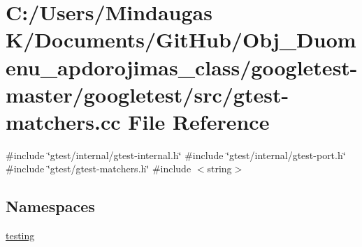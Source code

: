 \hypertarget{googletest-master_2googletest_2src_2gtest-matchers_8cc}{}\section{C\+:/\+Users/\+Mindaugas K/\+Documents/\+Git\+Hub/\+Obj\+\_\+\+Duomenu\+\_\+apdorojimas\+\_\+class/googletest-\/master/googletest/src/gtest-\/matchers.cc File Reference}
\label{googletest-master_2googletest_2src_2gtest-matchers_8cc}
{\ttfamily \#include \char`\"{}gtest/internal/gtest-\/internal.\+h\char`\"{}}\newline
{\ttfamily \#include \char`\"{}gtest/internal/gtest-\/port.\+h\char`\"{}}\newline
{\ttfamily \#include \char`\"{}gtest/gtest-\/matchers.\+h\char`\"{}}\newline
{\ttfamily \#include $<$string$>$}\newline
\subsection*{Namespaces}
\begin{DoxyCompactItemize}
\item 
 \mbox{\hyperlink{namespacetesting}{testing}}
\end{DoxyCompactItemize}

